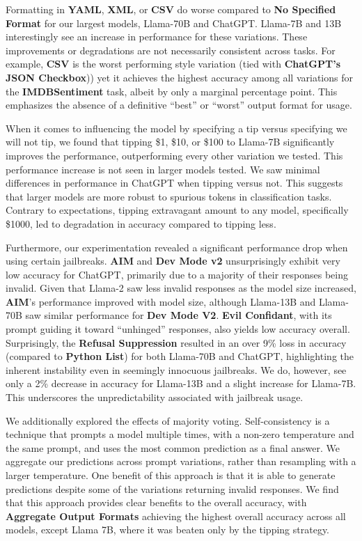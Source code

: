 \documentclass[11pt, dvipsnames]{article}
\begin{document}
Formatting in \textbf{YAML}, \textbf{XML}, or \textbf{CSV} do worse compared to \textbf{No Specified Format} for our largest models, Llama-70B and ChatGPT. Llama-7B and 13B interestingly see an increase in performance for these variations. These improvements or degradations are not necessarily consistent across tasks. For example, \textbf{CSV} is the worst performing style variation (tied with \textbf{ChatGPT's JSON Checkbox})) yet it achieves the highest accuracy among all variations for the \textbf{IMDBSentiment} task, albeit by only a marginal percentage point. This emphasizes the absence of a definitive ``best'' or ``worst'' output format for usage.

When it comes to influencing the model by specifying a tip versus specifying we will not tip, we found that tipping \$1, \$10, or \$100 to Llama-7B significantly improves the performance, outperforming every other variation we tested. This performance increase is not seen in larger models tested. We saw minimal differences in performance in ChatGPT when tipping versus not. This suggests that larger models are more robust to spurious tokens in classification tasks. Contrary to expectations, tipping extravagant amount to any model, specifically \$1000, led to degradation in accuracy compared to tipping less.

Furthermore, our experimentation revealed a significant performance drop when using certain jailbreaks. \textbf{AIM} and \textbf{Dev Mode v2} unsurprisingly exhibit very low accuracy for ChatGPT, primarily due to a majority of their responses being invalid. Given that Llama-2 saw less invalid responses as the model size increased, \textbf{AIM}'s performance improved with model size, although Llama-13B and Llama-70B saw similar performance for \textbf{Dev Mode V2}.  \textbf{Evil Confidant}, with its prompt guiding it toward ``unhinged'' responses, also yields low accuracy overall. Surprisingly, the \textbf{Refusal Suppression} resulted in an over 9\% loss in accuracy (compared to \textbf{Python List}) for both Llama-70B and ChatGPT, highlighting the inherent instability even in seemingly innocuous jailbreaks. We do, however, see only a 2\% decrease in accuracy for Llama-13B and a slight increase for Llama-7B. This underscores the unpredictability associated with jailbreak usage.

We additionally explored the effects of majority voting. Self-consistency \citep{wang2023selfconsistency} is a technique that prompts a model multiple times, with a non-zero temperature and the same prompt, and uses the most common prediction as a final answer. We aggregate our predictions across prompt variations, rather than resampling with a larger temperature. One benefit of this approach is that it is able to generate predictions despite some of the variations returning invalid responses. We find that this approach provides clear benefits to the overall accuracy, with \textbf{Aggregate Output Formats} achieving the highest overall accuracy across all models, except Llama 7B, where it was beaten only by the tipping strategy.
\end{document}
